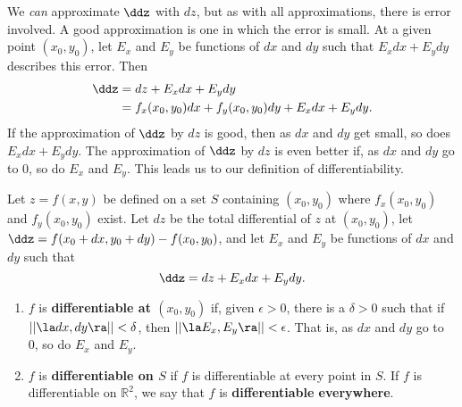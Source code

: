 We \textit{can} approximate $\ddz$ with $dz$, but as with all approximations, there is error involved. A good approximation is one in which the error is small. At a given point $(x_0,y_0)$, let $E_x$ and $E_y$ be functions of $dx$ and $dy$ such that $E_xdx+E_ydy$ describes this error. Then
\begin{align*}
\ddz &= dz + E_xdx+ E_ydy \\
		&= f_x(x_0,y_0)dx+f_y(x_0,y_0)dy + E_xdx+E_ydy.
\end{align*}
If the approximation of $\ddz$ by $dz$ is good, then as $dx$ and $dy$ get small,  so does $E_xdx+E_ydy$. The approximation of $\ddz$ by $dz$ is even better if, as $dx$ and $dy$ go to 0, so do $E_x$ and $E_y$. This leads us to our definition of differentiability.

{Let $z=f(x,y)$ be defined on a set $S$ containing $(x_0,y_0)$ where $f_x(x_0,y_0)$ and $f_y(x_0,y_0)$ exist. Let $dz$ be the total differential of $z$ at $(x_0,y_0)$, let $\ddz = f(x_0+dx,y_0+dy) - f(x_0,y_0)$, and let $E_x$ and $E_y$ be functions of $dx$ and $dy$  such that 
$$\ddz = dz + E_xdx + E_ydy.$$
\begin{enumerate}
	\item $f$ is \textbf{differentiable at $(x_0,y_0)$} if, given $\epsilon >0$, there is a $\delta >0$ such that if $||\la dx,dy\ra|| < \delta$, then $||\la E_x,E_y\ra|| < \epsilon$. That is, as $dx$ and $dy$ go to 0, so do $E_x$ and $E_y$.
	\item	$f$ is \textbf{differentiable on $S$} if $f$ is differentiable at every point in $S$. If $f$ is differentiable on $\mathbb{R}^2$, we say that $f$ is \textbf{differentiable everywhere}.
\end{enumerate}
}

